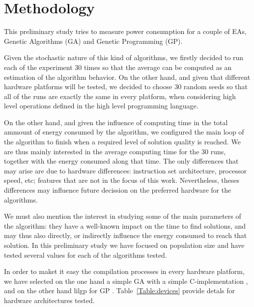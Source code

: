 \section{Methodology}

This preliminary study tries to measure power consumption for a couple
of EAs, Genetic Algorithms (GA) and Genetic Programming (GP). 

Given the stochastic nature of this kind of algorithms, we firstly decided to run each of the experiment 30 times so that the average can be computed as an estimation of the algorithm behavior.  On the other hand, and given that different hardware platforms will be tested, we decided to choose 30 random seeds so that all of the runs are exactly the same in every platform, when considering high level operations defined in the high level programming language.

On the other hand, and given the influence of computing time in the total ammount of energy consumed by the algorithm, we configured the main loop of the algorithm to finish when a required level of solution quality is reached. We are thus mainly interested in the average computing time for the 30 runs, together with the energy consumed along that time.  The only differences that may arise are due to hardware differences:  instruction set architecture, processor speed, etc;  %
features that are not in the focus of this work.  Nevertheless, theses differences may influence future decission on the preferred hardware for the algorithms.  

We must also mention the interest in studying some of the main parameters of the algorithm:  they have a well-known impact on the time to find solutions, and may thus also directly, or indirectly influence the energy consumed to reach that solution.  In this preliminary study we have focused on population size and have tested several values for each of the algorithms tested.

In order to maket it easy the compilation processes in every hardware platform, we have selected on the one hand a simple GA \cite{michalewicz} with a simple C-implementation \cite{web_algoritmo}, and on the other hand lilgp for GP \cite{lilgp}.  Table~\ref{Table:devices} provide detals for hardware architectures tested.

